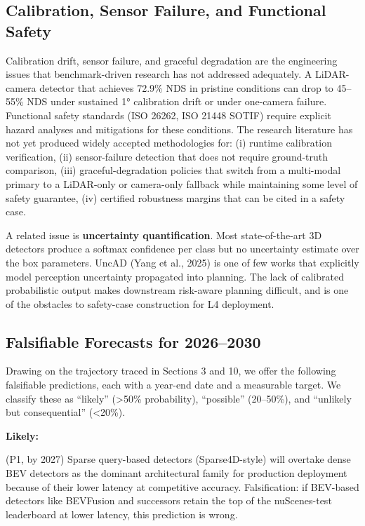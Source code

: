 \documentclass{article}
\begin{document}
\subsection{Calibration, Sensor Failure, and Functional Safety}\label{calibration-sensor-failure-and-functional-safety}

Calibration drift, sensor failure, and graceful degradation are the engineering issues that benchmark-driven research has not addressed adequately. A LiDAR-camera detector that achieves 72.9\% NDS in pristine conditions can drop to 45--55\% NDS under sustained 1° calibration drift or under one-camera failure. Functional safety standards (ISO 26262, ISO 21448 SOTIF) require explicit hazard analyses and mitigations for these conditions. The research literature has not yet produced widely accepted methodologies for: (i) runtime calibration verification, (ii) sensor-failure detection that does not require ground-truth comparison, (iii) graceful-degradation policies that switch from a multi-modal primary to a LiDAR-only or camera-only fallback while maintaining some level of safety guarantee, (iv) certified robustness margins that can be cited in a safety case.

A related issue is \textbf{uncertainty quantification}. Most state-of-the-art 3D detectors produce a softmax confidence per class but no uncertainty estimate over the box parameters. UncAD (Yang et al., 2025) is one of few works that explicitly model perception uncertainty propagated into planning. The lack of calibrated probabilistic output makes downstream risk-aware planning difficult, and is one of the obstacles to safety-case construction for L4 deployment.

\subsection{Falsifiable Forecasts for 2026--2030}\label{falsifiable-forecasts-for-20262030}

Drawing on the trajectory traced in Sections 3 and 10, we offer the following falsifiable predictions, each with a year-end date and a measurable target. We classify these as ``likely'' (\textgreater50\% probability), ``possible'' (20--50\%), and ``unlikely but consequential'' (\textless20\%).

\textbf{Likely:}

(P1, by 2027) Sparse query-based detectors (Sparse4D-style) will overtake dense BEV detectors as the dominant architectural family for production deployment because of their lower latency at competitive accuracy. Falsification: if BEV-based detectors like BEVFusion and successors retain the top of the nuScenes-test leaderboard at lower latency, this prediction is wrong.
\end{document}
